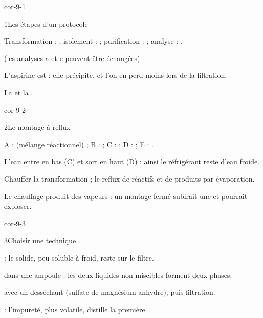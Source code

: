 \corrigesSouples

\begin{blocLivre}{cor-9-1}
\begin{corrige}{1}{Les étapes d'un protocole}
\begin{questions}
\item Transformation :  ; isolement :  ; purification :  ; analyse : .
\item {} (les analyses a et e peuvent être échangées).
\item L'aspirine est  : elle précipite, et l'on en perd moins lors de la filtration.
\item La  et la .
\end{questions}
\end{corrige}
\end{blocLivre}
\begin{blocLivre}{cor-9-2}
\begin{corrige}{2}{Le montage à reflux}
\begin{questions}
\item A :  (mélange réactionnel) ; B :  ; C :  ; D :  ;
E : .
\item L'eau entre en bas (C) et sort en haut (D) : ainsi le réfrigérant reste  d'eau froide.
\item Chauffer  la transformation ; le reflux  de réactifs et de produits par évaporation.
\item Le chauffage produit des vapeurs : un montage fermé subirait une  et pourrait exploser.
\end{questions}
\end{corrige}
\end{blocLivre}
\begin{blocLivre}{cor-9-3}
\begin{corrige}{3}{Choisir une technique}
\begin{questions}
\item {} : le solide, peu soluble à froid, reste sur le filtre.
\item {} dans une ampoule : les deux liquides non miscibles forment deux phases.
\item {} avec un desséchant (sulfate de magnésium anhydre), puis filtration.
\item {} : l'impureté, plus volatile, distille la première.
\end{questions}
\end{corrige}
\end{blocLivre}
